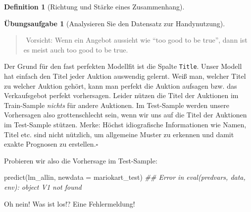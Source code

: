 \documentclass[
  a4paper,
  DIV=11]{scrreprt}
\newenvironment{Shaded}{\begin{snugshade}}{\end{snugshade}}
\newcommand{\AttributeTok}[1]{\textcolor[rgb]{0.40,0.45,0.13}{#1}}
\newcommand{\DocumentationTok}[1]{\textcolor[rgb]{0.37,0.37,0.37}{\textit{#1}}}
\newcommand{\FunctionTok}[1]{\textcolor[rgb]{0.28,0.35,0.67}{#1}}
\newcommand{\NormalTok}[1]{\textcolor[rgb]{0.00,0.23,0.31}{#1}}
\theoremstyle{definition}
\newtheorem{exercise}{Übungsaufgabe}[chapter]
\theoremstyle{definition}
\theoremstyle{definition}
\newtheorem{definition}{Definition}[chapter]
\theoremstyle{remark}
\begin{document}
\begin{definition}[Richtung und Stärke eines
Zusammenhang]
\begin{exercise}[Analysieren Sie den Datensatz zur
Handynutzung]
\begin{quote}
{}️ Vorsicht: Wenn ein Angebot aussieht wie
``too good to be true'', dann ist es meist auch too good to be true.
\end{quote}

\begin{tcolorbox}[enhanced jigsaw, leftrule=.75mm, opacitybacktitle=0.6, colback=white, colframe=quarto-callout-note-color-frame, coltitle=black, colbacktitle=quarto-callout-note-color!10!white, opacityback=0, left=2mm, breakable, titlerule=0mm, toptitle=1mm, bottomtitle=1mm, rightrule=.15mm, title=\textcolor{quarto-callout-note-color}{\faInfo}\hspace{0.5em}{Overfitting}, arc=.35mm, bottomrule=.15mm, toprule=.15mm]

Der Grund für den fast perfekten Modellfit ist die Spalte
\texttt{Title}. Unser Modell hat einfach den Titel jeder Auktion
auswendig gelernt. Weiß man, welcher Titel zu welcher Auktion gehört,
kann man perfekt die Auktion aufsagen bzw. das Verkaufsgebot perfekt
vorhersagen. Leider nützen die Titel der Auktionen im Train-Sample
\emph{nichts} für andere Auktionen. Im Test-Sample werden unsere
Vorhersagen also grottenschlecht sein, wenn wir uns auf die Titel der
Auktionen im Test-Sample stützen. Merke: Höchst idiografische
Informationen wie Namen, Titel etc. sind nicht nützlich, um allgemeine
Muster zu erkennen und damit exakte Prognosen zu erstellen.\(\square\)

\end{tcolorbox}

Probieren wir also die Vorhersage im Test-Sample:

\begin{Shaded}
\begin{Highlighting}[]
\FunctionTok{predict}\NormalTok{(lm\_allin, }\AttributeTok{newdata =}\NormalTok{ mariokart\_test)}
\DocumentationTok{\#\# Error in eval(predvars, data, env): object \textquotesingle{}V1\textquotesingle{} not found}
\end{Highlighting}
\end{Shaded}

Oh nein! Was ist los!? Eine Fehlermeldung!

\begin{tcolorbox}[enhanced jigsaw, leftrule=.75mm, opacitybacktitle=0.6, colback=white, colframe=quarto-callout-caution-color-frame, coltitle=black, colbacktitle=quarto-callout-caution-color!10!white, opacityback=0, left=2mm, breakable, titlerule=0mm, toptitle=1mm, bottomtitle=1mm, rightrule=.15mm, title=\textcolor{quarto-callout-caution-color}{\faFire}\hspace{0.5em}{Vorsicht}, arc=.35mm, bottomrule=.15mm, toprule=.15mm]


\end{tcolorbox}
\end{exercise}
\end{definition}
\end{document}
